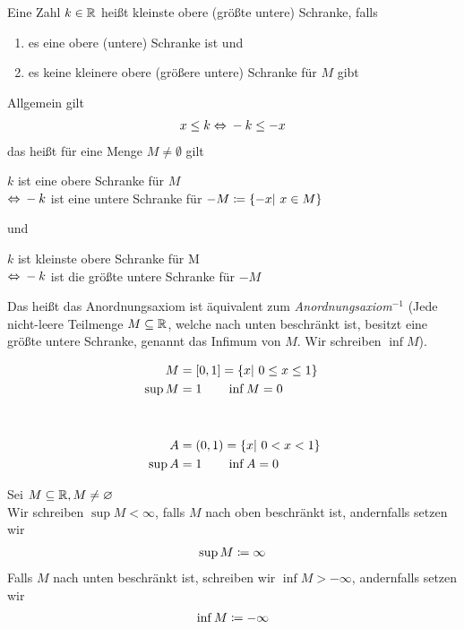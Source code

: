 \begin{definition}
    Eine Zahl $k\in\mathbb{R}$ heißt kleinste obere (größte untere) Schranke, falls
    \begin{enumerate}
        \item es eine obere (untere) Schranke ist und
        \item es keine kleinere obere (größere untere) Schranke für $M$ gibt
    \end{enumerate}
\end{definition}

\begin{folgerung}
    \theoremescape
    Allgemein gilt
    \begin{align*}
        x \leq k \Leftrightarrow{} -k \leq -x
    \end{align*}
    das heißt für eine Menge $M\neq\emptyset$ gilt
    \begin{center}
        $k$ ist eine obere Schranke für $M$\\ $\Leftrightarrow{} -k$ ist eine untere Schranke für $-M\coloneqq\left\{-x|~x\in M\right\}$
    \end{center}
    und
    \begin{center}
        $k$ ist kleinste obere Schranke für M\\ $\Leftrightarrow{} -k$ ist die größte untere Schranke für $-M$
    \end{center}
    Das heißt das Anordnungsaxiom ist äquivalent zum \textit{Anordnungsaxiom}$^{-1}$ (Jede nicht-leere Teilmenge $M\subseteq \mathbb{R}$, welche nach unten beschränkt ist, besitzt eine größte untere Schranke, genannt das Infimum von $M$. Wir schreiben $\inf M$).
\end{folgerung}

\begin{beispiel}
    \theoremescape
    \begin{align*}
        M &= \interv{0,1} = \set{x|~0\leq x \leq 1}\\
        \sup M &= 1 \qquad \inf M = 0\nn
        A &= \pair{0,1} = \set{x|~0< x < 1}\\
        \sup A &= 1 \qquad \inf A = 0\\
    \end{align*}
\end{beispiel}

\begin{notation}
    Sei $M\subseteq \mathbb{R}, M\neq \varnothing$\\
    Wir schreiben $\sup M < \infty$, falls $M$ nach oben beschränkt ist, andernfalls setzen wir
    \begin{align*}
        \sup M \coloneqq \infty
    \end{align*}
    Falls $M$ nach unten beschränkt ist, schreiben wir $\inf M > -\infty$, andernfalls setzen wir
    \begin{align*}
        \inf M \coloneqq -\infty
    \end{align*}
\end{notation}

